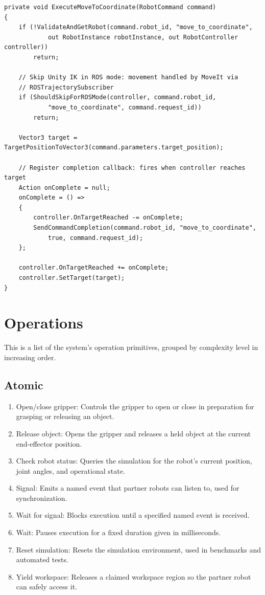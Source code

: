 \documentclass[
     12pt,
     a4paper,
     BCOR=10mm,
     DIV=14,
     listof=totoc,
     bibliography=totoc,
     parskip,
     twoside,
     headsepline
     ]{scrreprt}
\begin{document}
\begin{lstlisting}[caption={Unity C\# engine implementation processing the command block, asynchronous callback hooks, and IK targeting.}, extendedchars=true]
private void ExecuteMoveToCoordinate(RobotCommand command)
{
    if (!ValidateAndGetRobot(command.robot_id, "move_to_coordinate",
            out RobotInstance robotInstance, out RobotController controller))
        return;

    // Skip Unity IK in ROS mode: movement handled by MoveIt via
    // ROSTrajectorySubscriber
    if (ShouldSkipForROSMode(controller, command.robot_id,
            "move_to_coordinate", command.request_id))
        return;

    Vector3 target = TargetPositionToVector3(command.parameters.target_position);

    // Register completion callback: fires when controller reaches target
    Action onComplete = null;
    onComplete = () =>
    {
        controller.OnTargetReached -= onComplete;
        SendCommandCompletion(command.robot_id, "move_to_coordinate",
            true, command.request_id);
    };

    controller.OnTargetReached += onComplete;
    controller.SetTarget(target);
}
\end{lstlisting}

\section{Operations}
This is a list of the system's operation primitives, grouped by complexity level in increasing order.

\subsection{Atomic}
\begin{enumerate}
	\item Open/close gripper: Controls the gripper to open or close in preparation for grasping or releasing an object.
	\item Release object: Opens the gripper and releases a held object at the current end-effector position.
	\item Check robot status: Queries the simulation for the robot's current position, joint angles, and operational state.
	\item Signal: Emits a named event that partner robots can listen to, used for synchronization.
	\item Wait for signal: Blocks execution until a specified named event is received.
	\item Wait: Pauses execution for a fixed duration given in milliseconds.
	\item Reset simulation: Resets the simulation environment, used in benchmarks and automated tests.
	\item Yield workspace: Releases a claimed workspace region so the partner robot can safely access it.
\end{enumerate}
\end{document}
